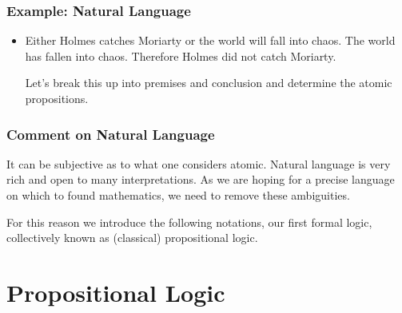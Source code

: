 \documentclass{beamer}
\theoremstyle{indentDefn} \newtheorem{defn}[]{Definition}
\begin{document}
\begin{frame}
	\frametitle{Example: Natural Language}
	
	\begin{itemize}
		\item Either Holmes catches Moriarty or the world will fall into chaos. The world has fallen into chaos. Therefore Holmes did not catch Moriarty.
		
		\vspace{0.5cm}
		
		Let's break this up into premises and conclusion and determine the atomic propositions.
		
		\vspace{5cm}
		
		
	\end{itemize}
\end{frame}

\begin{frame}
	\frametitle{Comment on Natural Language}
	
	
	It can be subjective as to what one considers atomic. Natural language is very rich and open to many interpretations. As we are hoping for a precise language on which to found mathematics, we need to remove these ambiguities. 
	
	\vspace{1cm}
	
	For this reason we introduce the following notations, our first formal logic, collectively known as (classical) propositional logic.
	
	
\end{frame}

\section{Propositional Logic}
\end{document}
